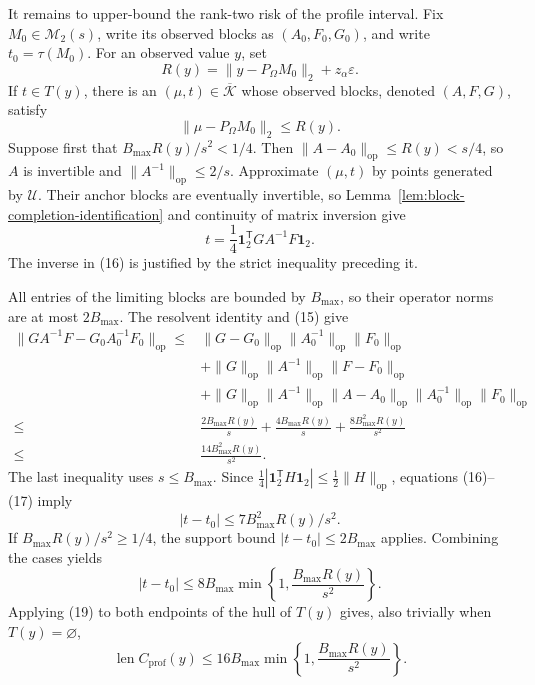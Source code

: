 It remains to upper-bound the rank-two risk of the profile interval.  Fix \(M_0\in\mathcal M_2(s)\), write its observed blocks as \((A_0,F_0,G_0)\), and write \(t_0=\tau(M_0)\).  For an observed value \(y\), set
\[
 R(y)=\lVert y-P_\Omega M_0\rVert_2+z_\alpha\varepsilon.
\tag{14}
\]
If \(t\in T(y)\), there is an \((\mu,t)\in\overline{\mathcal K}\) whose observed blocks, denoted \((A,F,G)\), satisfy
\[
 \lVert\mu-P_\Omega M_0\rVert_2\leq R(y).
\tag{15}
\]
Suppose first that \(B_{\max}R(y)/s^2<1/4\).  Then \(\lVert A-A_0\rVert_{\mathrm{op}}\leq R(y)<s/4\), so \(A\) is invertible and \(\lVert A^{-1}\rVert_{\mathrm{op}}\leq2/s\).  Approximate \((\mu,t)\) by points generated by \(\mathcal U\).  Their anchor blocks are eventually invertible, so Lemma~\ref{lem:block-completion-identification} and continuity of matrix inversion give
\[
 t=\frac14\mathbf1_2^{\mathsf T}GA^{-1}F\mathbf1_2.
\tag{16}
\]
The inverse in (16) is justified by the strict inequality preceding it.

All entries of the limiting blocks are bounded by \(B_{\max}\), so their operator norms are at most \(2B_{\max}\).  The resolvent identity and (15) give
\[
\begin{split}
 \lVert GA^{-1}F-G_0A_0^{-1}F_0\rVert_{\mathrm{op}}
 \leq{}&\lVert G-G_0\rVert_{\mathrm{op}}\lVert A_0^{-1}\rVert_{\mathrm{op}}\lVert F_0\rVert_{\mathrm{op}}\\
 &+\lVert G\rVert_{\mathrm{op}}\lVert A^{-1}\rVert_{\mathrm{op}}\lVert F-F_0\rVert_{\mathrm{op}}\\
 &+\lVert G\rVert_{\mathrm{op}}\lVert A^{-1}\rVert_{\mathrm{op}}
 \lVert A-A_0\rVert_{\mathrm{op}}\lVert A_0^{-1}\rVert_{\mathrm{op}}
 \lVert F_0\rVert_{\mathrm{op}}\\
 \leq{}&\frac{2B_{\max}R(y)}s+\frac{4B_{\max}R(y)}s
 +\frac{8B_{\max}^2R(y)}{s^2}\\
 \leq{}&\frac{14B_{\max}^2R(y)}{s^2}.
\end{split}
\tag{17}
\]
The last inequality uses \(s\leq B_{\max}\).  Since \(\tfrac14|\mathbf1_2^{\mathsf T}H\mathbf1_2|\leq\tfrac12\lVert H\rVert_{\mathrm{op}}\), equations (16)--(17) imply
\[
 |t-t_0|\leq7B_{\max}^2R(y)/s^2.
\tag{18}
\]
If \(B_{\max}R(y)/s^2\geq1/4\), the support bound \(|t-t_0|\leq2B_{\max}\) applies.  Combining the cases yields
\[
 |t-t_0|\leq8B_{\max}
 \min\left\{1,\frac{B_{\max}R(y)}{s^2}\right\}.
\tag{19}
\]
Applying (19) to both endpoints of the hull of \(T(y)\) gives, also trivially when \(T(y)=\varnothing\),
\[
 \operatorname{len}C_{\mathrm{prof}}(y)
 \leq16B_{\max}
 \min\left\{1,\frac{B_{\max}R(y)}{s^2}\right\}.
\tag{20}
\]

